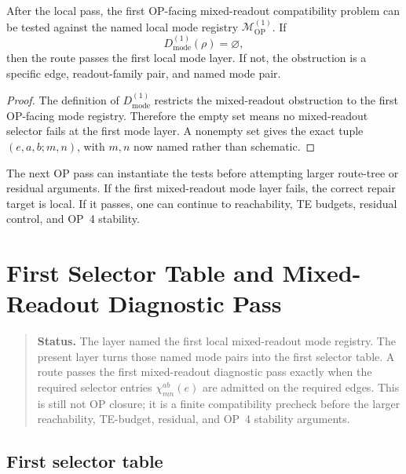 \begin{theorem}
\label{thm:v410r20-first-mode-registry-reduction}
After the local pass, the first OP-facing mixed-readout compatibility problem can be tested
against the named local mode registry \(\mathcal M_{\mathrm{OP}}^{(1)}\). If
\[
 D_{\mathrm{mode}}^{(1)}(\rho)=\varnothing,
\]
then the route passes the first local mode layer. If not, the obstruction is a
specific edge, readout-family pair, and named mode pair.
\end{theorem}

\begin{proof}
The definition of \(D_{\mathrm{mode}}^{(1)}\) restricts the mixed-readout
obstruction to the first OP-facing mode registry. Therefore the empty set means
no mixed-readout selector fails at the first mode layer. A nonempty set gives
the exact tuple \((e,a,b;m,n)\), with \(m,n\) now named rather than schematic.
\end{proof}

\begin{remark}
\label{rem:v410r20-use-in-next-op-pass}
The next OP pass can instantiate the tests before attempting larger
route-tree or residual arguments. If the first mixed-readout mode layer fails,
the correct repair target is local. If it passes, one can continue to
reachability, TE budgets, residual control, and OP~4 stability.
\end{remark}



\clearpage
\section{First Selector Table and Mixed-Readout Diagnostic Pass}
\label{sec:v410r21-first-selector-table-diagnostic-pass}

\begin{quote}\small
\noindent\textbf{Status.}
The layer named the first local mixed-readout mode registry. The present
layer turns those named mode pairs into the first selector table. A route
passes the first mixed-readout diagnostic pass exactly when the required
selector entries \(\chi^{ab}_{mn}(e)\) are admitted on the required edges.
This is still not OP closure; it is a finite compatibility precheck before the
larger reachability, TE-budget, residual, and OP~4 stability arguments.
\end{quote}

\subsection{First selector table}
\label{subsec:v410r21-first-selector-table}

